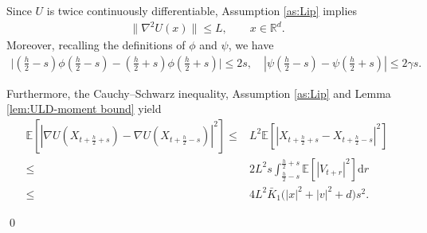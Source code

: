 \documentclass[12pt]{article}
\newenvironment{redtext}
  {\color{black}\ignorespaces}
  {\ignorespacesafterend}
\numberwithin{equation}{section}
\renewenvironment{proof}%
  {\begin{trivlist}%
   \item[]\ignorespaces}%
  {\qed\end{trivlist}}
\newcommand{\E}{\mathbb{E}}
\newcommand{\dd}{\mathrm{d}}
\begin{document}
\begin{redtext}
\begin{proof}
Since $U$ is twice continuously differentiable, Assumption \ref{as:Lip}
implies
\begin{align}
    \|\nabla^2 U(x)\|\leq L,
    \qquad x\in\mathbb{R}^d.
\end{align}
Moreover, recalling the definitions of $\phi$ and $\psi$, we have
\begin{align}
\big|
(\tfrac h2-s)\phi(\tfrac h2-s)
-
(\tfrac h2+s)\phi(\tfrac h2+s)
\big|
\leq 2s,
\quad
\left|
\psi(\tfrac h2-s)-\psi(\tfrac h2+s)
\right|
\leq 2\gamma s.
\label{eq:R3-mid-coeff}
\end{align}

Furthermore, the Cauchy--Schwarz inequality, Assumption \ref{as:Lip} and Lemma \ref{lem:ULD-moment bound} yield
\begin{align}
\E\left[
\left|
\nabla U(X_{t+\frac h2+s})
-
\nabla U(X_{t+\frac h2-s})
\right|^2
\right]
\leq&
L^2\E\left[\left|X_{t+\frac h2+s}-X_{t+\frac h2-s}\right|^2\right]
\nonumber\\
\leq&
2L^2s
\int_{\frac h2-s}^{\frac h2+s}
\E\left[|V_{t+r}|^2\right]\dd r
\nonumber\\
\leq&
4L^2\bar K_1
\bigl(|x|^2+|v|^2+d\bigr)s^2.
\label{eq:R3-mid-grad-diff}
\end{align}


\end{proof}
\end{redtext}
\end{document}
